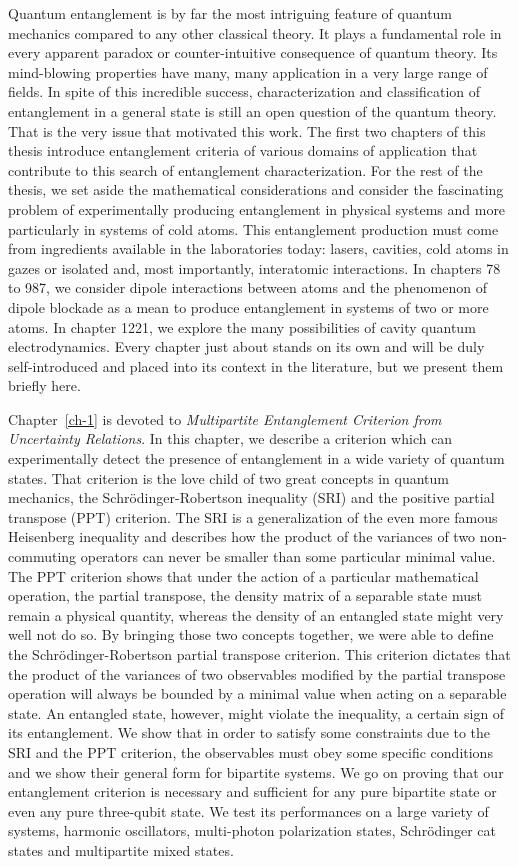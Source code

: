 Quantum entanglement is by far the most intriguing feature of quantum mechanics compared to any other classical theory. It plays a fundamental role in every apparent paradox or counter-intuitive consequence of quantum theory. Its mind-blowing properties have many, many application in a very large range of fields. In spite of this incredible success, characterization and classification of entanglement in a general state is still an open question of the quantum theory. That is the very issue that motivated this work. The first two chapters of this thesis introduce entanglement criteria of various domains of application that contribute to this search of entanglement characterization. For the rest of the thesis, we set aside the mathematical considerations and consider the fascinating problem of experimentally producing entanglement in physical systems and more particularly in systems of cold atoms.  This entanglement production must come from ingredients  available in the laboratories today: lasers, cavities, cold atoms in gazes or isolated and, most importantly, interatomic interactions. In chapters 78 to 987, we consider dipole interactions between atoms and the phenomenon of dipole blockade as a mean to produce entanglement in systems of two or more atoms. In chapter 1221, we explore the many possibilities of cavity quantum electrodynamics.  Every chapter just about stands on its own and will be duly self-introduced and placed into its context in the literature, but we present them briefly here.

Chapter~\ref{ch-1} is devoted to \textit{Multipartite Entanglement Criterion from Uncertainty Relations}. In this chapter, we describe a criterion which can experimentally detect the presence of entanglement in a wide variety of quantum states. That criterion is the love child of two great concepts in quantum mechanics, the Schr\"odinger-Robertson inequality (SRI) and the positive partial transpose (PPT) criterion. The SRI is a generalization of the even more famous Heisenberg inequality and describes how the product of the variances of two non-commuting operators can never be smaller than some particular minimal value. The PPT criterion shows that under the action of a particular mathematical operation, the partial transpose, the density matrix of a separable state must remain a physical quantity, whereas the density of an entangled state might very well not do so. By bringing those two concepts together, we were able to define the Schr\"odinger-Robertson partial transpose criterion. This criterion dictates that the product of the variances of two observables modified by the partial transpose operation will always be bounded by a minimal value when acting on a separable state. An entangled state, however, might violate the inequality, a certain sign of its entanglement. We show that in order to satisfy some constraints due to the SRI and the PPT criterion, the observables must obey some specific conditions and we show their general form for bipartite systems. We go on proving that our entanglement criterion is necessary and sufficient for any pure bipartite state or even any pure three-qubit state. We test its performances on a large variety of systems, harmonic oscillators, multi-photon polarization states, Schr\"odinger cat states and multipartite mixed states.

